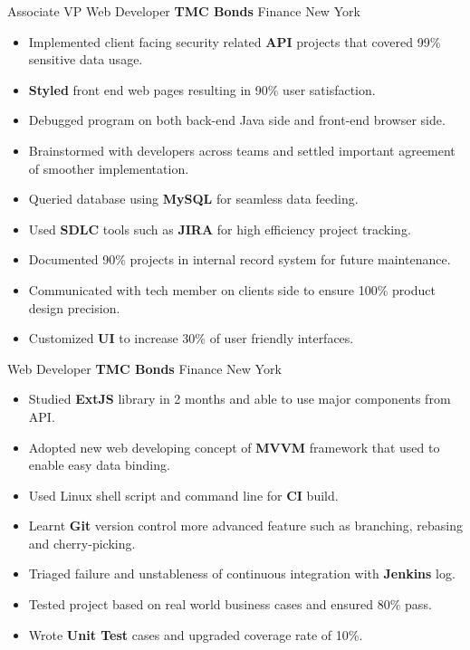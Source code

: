 \documentclass[11pt,a4paper,sans]{moderncv}   %
\begin{document}
{Associate VP Web Developer}
{\textbf{TMC Bonds}}
{Finance}
{New York}
{
  \begin{itemize}
    \item{Implemented client facing security related \textbf{API} projects that covered 99\% sensitive data usage.}
	  \item{\textbf{Styled} front end web pages resulting in 90\% user satisfaction.}
	  \item{Debugged program on both back-end Java side and front-end browser side.}
	  \item{Brainstormed with developers across teams and settled important agreement of smoother implementation.}
	  \item{Queried database using \textbf{MySQL} for seamless data feeding.}
	  \item{Used \textbf{SDLC} tools such as \textbf{JIRA} for high efficiency project tracking.}
	  \item{Documented 90\% projects in internal record system for future maintenance.}
	  \item{Communicated with tech member on clients side to ensure 100\% product design precision.}
	  \item{Customized \textbf{UI} to increase 30\% of user friendly interfaces.}
	\end{itemize}
}

\cventry{}
{Web Developer}
{\textbf{TMC Bonds}}
{Finance}
{New York}
{
	\begin{itemize}
    \item{Studied \textbf{ExtJS} library in 2 months and able to use major components from API.}
    \item{Adopted new web developing concept of \textbf{MVVM} framework that used to enable easy data binding.}
    \item{Used Linux shell script and command line for \textbf{CI} build.}
    \item{Learnt \textbf{Git} version control more advanced feature such as branching, rebasing and cherry-picking.}
    \item{Triaged failure and unstableness of continuous integration with \textbf{Jenkins} log.}
    \item{Tested project based on real world business cases and ensured 80\% pass.}
    \item{Wrote \textbf{Unit Test} cases and upgraded coverage rate of 10\%.}
	\end{itemize}
}
\end{document}
